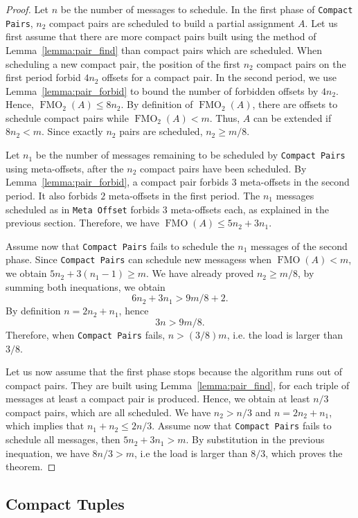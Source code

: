 \documentclass[a4paper,UKenglish,cleveref, autoref, thm-restate]{lipics-v2019}
\DeclareMathOperator{\Fmo}{FMO}
\newcommand\compactpair{\texttt{Compact Pairs}\xspace}
\newcommand\metaoffset{\texttt{Meta Offset}\xspace}
\begin{document}
\begin{proof}
Let $n$ be the number of messages to schedule.
In the first phase of \compactpair, $n_2$ compact pairs are scheduled to build a partial assignment $A$. Let us first assume that there are more compact pairs built using the method of Lemma~\ref{lemma:pair_find} than compact pairs which are scheduled.
When scheduling a new compact pair, the position of the first $n_2$ compact pairs on the first period forbid $4n_2$ offsets for a compact pair. In the second period, we use Lemma~\ref{lemma:pair_forbid} to bound the number of forbidden offsets by $4n_2$.   
Hence, $\Fmo_2(A) \leq 8n_2$. By definition of $\Fmo_2(A)$, there are offsets to schedule compact pairs while $\Fmo_2(A) < m$. Thus, $A$ can be extended if $8n_2 < m$.
Since exactly $n_2$ pairs are scheduled, $n_2 \geq m/8$.  

Let $n_1$ be the number of messages remaining to be scheduled by \compactpair using meta-offsets, after the $n_2$ compact pairs have been scheduled. By Lemma~\ref{lemma:pair_forbid}, a compact pair forbids $3$ meta-offsets in the second period. It also forbids $2$ meta-offsets in the first period. The $n_1$ messages scheduled as in \metaoffset forbids $3$ meta-offsets each, as explained in the previous section.
Therefore, we have $\Fmo(A) \leq 5n_2 + 3n_1$. 

Assume now that \compactpair fails to schedule the $n_1$ messages of the second phase.
Since \compactpair can schedule new messagess when $\Fmo(A) < m$, 
we obtain $5n_2 + 3(n_1-1) \geq m$. We have already proved $n_2 \geq  m/8$, by summing both inequations, we obtain $$6n_2 + 3n_1 > 9m/8 + 2.$$ By definition $n = 2n_2 + n_1$, hence $$3n > 9m/8.$$ Therefore, when \compactpair fails, $n > (3/8)m$, i.e. the load is larger than $3/8$.

Let us now assume that the first phase stops because the algorithm runs out of compact pairs. They are built using Lemma~\ref{lemma:pair_find}, for each triple of messages at least a compact pair is produced. Hence, we obtain at least $n/3$ compact pairs, which are all scheduled. We have $n_2 > n/3$ and $n= 2n_2 + n_1$, which implies that $n_1 + n_2 \leq 2n/3$.
Assume now that \compactpair fails to schedule all messages, then $5n_2 + 3n_1 > m$.
By substitution in the previous inequation, we have $ 8n/3  > m$, i.e the load is larger than $8/3$, which proves the theorem.
\end{proof}



\subsection{Compact Tuples}\label{sec:compact}
\end{document}
